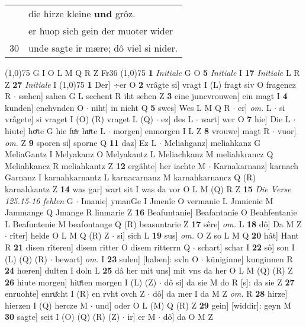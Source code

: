 \documentclass[8pt,a4paper,notitlepage]{article}
\begin{document}
\begin{table}[ht]
\begin{minipage}[t]{0.5\linewidth}
\begin{tabular}{rl}
 & die hirze kleine \textbf{und} grôz.\\ 
 & er huop sich gein der muoter wider\\ 
30 & unde sagte ir mære; dô viel si nider.\\ 
\end{tabular}
\scriptsize
\line(1,0){75} \newline
G I O L M Q R Z Fr36 \newline
\line(1,0){75} \newline
\textbf{1} \textit{Initiale} G O  \textbf{5} \textit{Initiale} I  \textbf{17} \textit{Initiale} L R Z  \textbf{27} \textit{Initiale} I  \newline
\line(1,0){75} \newline
\textbf{1} Der] ÷er O \textbf{2} vrâgte si] vragt I (L) fragt siv O fragencz R  $\cdot$ sæhen] sahen G L sechent R iht sehen Z \textbf{3} eine juncvrouwen] ein magt I \textbf{4} kunden] enchvnden O  $\cdot$ niht] in nicht Q \textbf{5} swes] Wes L M Q R  $\cdot$ er] \textit{om.} L  $\cdot$ si vrâgete] si vraget I (O) (R) vraget L (Q)  $\cdot$ ez] des L  $\cdot$ wart] wer O \textbf{7} hie] Die L  $\cdot$ hiute] hoͮte G hie fuͯr huͯte L  $\cdot$ morgen] enmorgen I L Z \textbf{8} vrouwe] magt R  $\cdot$ vuor] \textit{om.} Z \textbf{9} sporen si] sporne Q \textbf{11} daz] Ez L  $\cdot$ Meliahganz] meliahkanz G MeliaGantz I Melyakanz O Melyakantz L Meliachkanz M meliahkrancz Q Meliahkancz R meliahkantz Z \textbf{12} ergâhte] her iachte M  $\cdot$ Karnakarnanz] karnach Garnanz I karnahkarnantz L karnacarnanz M karnahkarnancz Q (R) karnahkantz Z \textbf{14} was gar] wart sit I was da vor O L M (Q) R Z \textbf{15} \textit{Die Verse 125.15-16 fehlen} G   $\cdot$ Imanie] ymanGe I Jmenîe O vermanie L Jmnienie M Jammange Q Jmange R linmarie Z \textbf{16} Beafuntanie] Beafantanîe O Beahfentanie L Beafuntenie M beafontange Q (R) beasuntarie Z \textbf{17} sêre] \textit{om.} L \textbf{18} dô] Da M Z  $\cdot$ rîter] helde O L M Q (R) Z  $\cdot$ si] sich L \textbf{19} sus] \textit{om.} O Z so L M Q \textbf{20} hât] Hant R \textbf{21} disen rîteren] disem ritter O disem ritterrn Q  $\cdot$ schart] schar I \textbf{22} sô] son I (L) (Q) (R)  $\cdot$ bewart] \textit{om.} I \textbf{23} sulen] [haben]: svln O  $\cdot$ küniginne] kunginnen R \textbf{24} hœren] dulten I doln L \textbf{25} dâ her mit uns] mit vns da her O L M (Q) (R) Z \textbf{26} hiute morgen] hiuͤten morgen I (L) (Z)  $\cdot$ dô si] da sie M do R [s]: da sie Z \textbf{27} enruohte] enruͤcht I (R) en rvht ovch Z  $\cdot$ dô] da mer I da M Z \textit{om.} R \textbf{28} hirze] hierzen I (Q) hercze M  $\cdot$ und] oder O L (M) Q (R) Z \textbf{29} gein] [widdir]: geyn M \textbf{30} sagte] seit I (O) (Q) (R) (Z)  $\cdot$ ir] er M  $\cdot$ dô] da O M Z \newline

\end{minipage}
\end{table}
\end{document}
